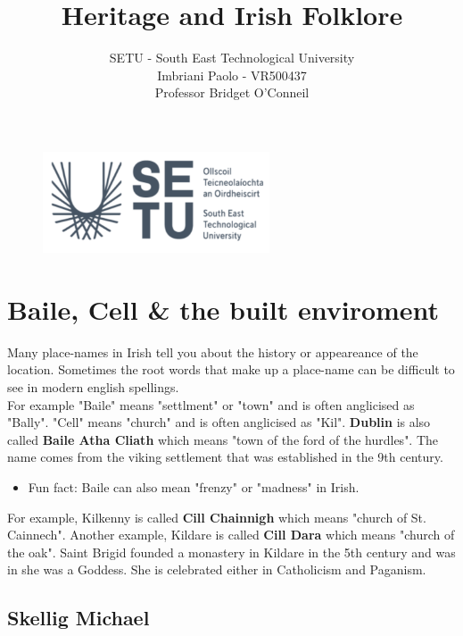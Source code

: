 \documentclass[a4paper]{article}
\title{Heritage and Irish Folklore}
\author{SETU - South East Technological University\\Imbriani Paolo - VR500437\\Professor Bridget O'Conneil}
\begin{document}
\begin{figure}
    \centering
    \includegraphics[width=0.6\textwidth]{SETU.png}
    \label{fig:centered-image}
\end{figure}

\maketitle 

\pagebreak

\tableofcontents

\pagebreak

\section{Baile, Cell \& the built enviroment}

Many place-names in Irish tell you about the history or appeareance of the location. Sometimes the root words that make 
up a place-name can be difficult to see in modern english spellings.
\\
For example "Baile" means "settlment" or "town" and is often anglicised as "Bally". "Cell" means "church" and is often anglicised as "Kil".
\textbf{Dublin} is also called \textbf{Baile Atha Cliath} which means "town of the ford of the hurdles". The name comes from the viking settlement that was established in the 9th century.
\begin{itemize}
    \item Fun fact: Baile can also mean "frenzy" or "madness" in Irish.
\end{itemize}
For example, Kilkenny is called \textbf{Cill Chainnigh} which means "church of St. Cainnech". 
Another example, Kildare is called \textbf{Cill Dara} which means "church of the oak". Saint Brigid founded a monastery in Kildare in the 5th century and was in she was a Goddess.
She is celebrated either in Catholicism and Paganism.

\subsection{Skellig Michael}
\end{document}
